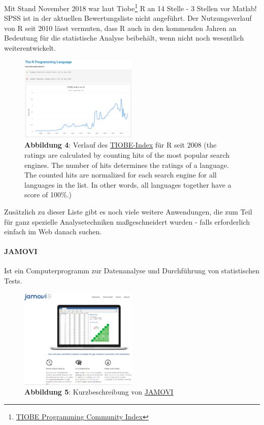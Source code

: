 \documentclass[]{article}
\let\oldparagraph\paragraph
\renewcommand{\paragraph}[1]{\oldparagraph{#1}\mbox{}}
\let\rmarkdownfootnote\footnote%
\def\footnote{\protect\rmarkdownfootnote}
\begin{document}
Mit Stand November 2018 war laut Tiobe\footnote{\href{https://www.tiobe.com/}{TIOBE
  Programming Community Index}} R an 14 Stelle - 3 Stellen vor Matlab!
SPSS ist in der aktuellen Bewertungsliste nicht angeführt. Der
Nutzungsverlauf von R seit 2010 lässt vermuten, dass R auch in den
kommenden Jahren an Bedeutung für die statistische Analyse beibehält,
wenn nicht noch wesentlich weiterentwickelt.

\begin{figure}
\centering
\includegraphics[width=0.50000\textwidth]{Images/TiobeRVerlauf.PNG}
\caption{\textbf{Abbildung 4}: Verlauf des
\href{https://www.tiobe.com/tiobe-index/}{TIOBE-Index} für R seit 2008
(the ratings are calculated by counting hits of the most popular search
engines. The number of hits determines the ratings of a language. The
counted hits are normalized for each search engine for all languages in
the list. In other words, all languages together have a score of
100\%.)}
\end{figure}

Zusätzlich zu dieser Liste gibt es noch viele weitere Anwendungen, die
zum Teil für ganz spezielle Analysetechniken maßgeschneidert wurden -
falls erforderlich einfach im Web danach suchen.

\paragraph{JAMOVI}\label{jamovi}

Ist ein Computerprogramm zur Datenanalyse und Durchführung von
statistischen Tests.

\begin{figure}
\centering
\includegraphics[width=0.50000\textwidth]{Images/JAMOVI.PNG}
\caption{\textbf{Abbildung 5}: Kurzbeschreibung von
\href{https://www.jamovi.org/}{JAMOVI}}
\end{figure}
\end{document}
